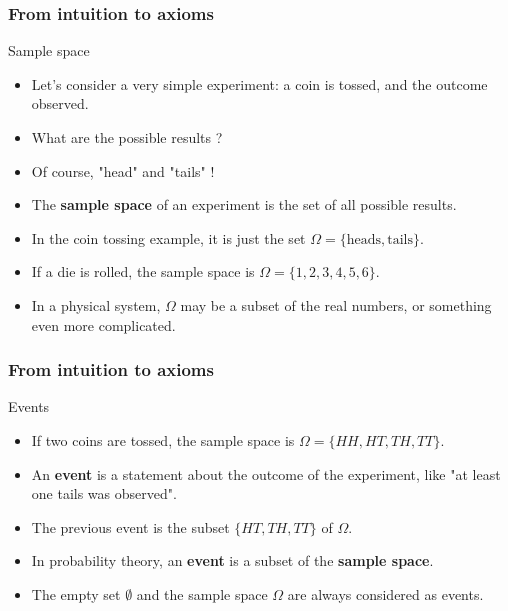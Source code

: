 \documentclass[main.tex]{subfiles}
\begin{document}
\begin{frame}
    \frametitle{From intuition to axioms }
\begin{block}{Sample space}
    \begin{itemize}
        \item<+-> Let's consider a very simple experiment: a coin is tossed, and the outcome observed.
        \item<+-> What are the possible results ?
        \item<+-> Of course, "head" and "tails" !
        \item<+-> The \textbf{sample space} of an experiment is the set of all possible results.
        \item<+-> In the coin tossing example, it is just the set $\Omega = \{ \text{heads}, \text{tails}\}.$
        \item<+-> If a die is rolled, the sample space is $\Omega = \{ 1,2,3,4,5, 6\}.$
        \item<+-> In a physical system, $\Omega$ may be a subset of the real numbers,
        or something even more complicated.
    \end{itemize}
\end{block}    
\end{frame}
\begin{frame}
    \frametitle{From intuition to axioms}
\begin{block}{Events}
    \begin{itemize}
        \item<+-> If two coins are tossed, the sample space is 
        $\Omega = \{ HH, HT, TH, TT \}.$
        \item<+-> An \textbf{event} is a statement about the outcome of the experiment, 
        like "at least one tails was observed".
        \item<+-> The previous event is the subset $\{HT,TH,TT\}$ of $\Omega.$
        \item<+-> In probability theory, an \textbf{event} is a subset of the \textbf{sample space}.
        \item<+-> The empty set $\emptyset$ and the sample space $\Omega$ are 
        always considered as events.
    \end{itemize}
\end{block}
\end{frame}
\end{document}
